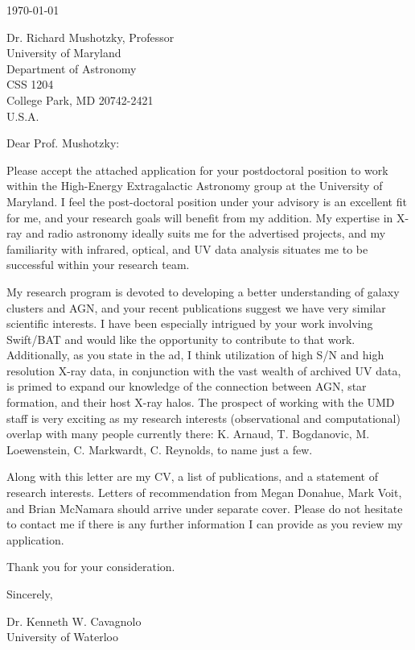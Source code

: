 \documentclass[11pt]{article}
\begin{document}
\today

Dr. Richard Mushotzky, Professor\\
University of Maryland\\
Department of Astronomy\\
CSS 1204\\
College Park, MD 20742-2421\\
U.S.A.

Dear Prof. Mushotzky:

Please accept the attached application for your postdoctoral position
to work within the High-Energy Extragalactic Astronomy group at the
University of Maryland. I feel the post-doctoral position under your
advisory is an excellent fit for me, and your research goals will
benefit from my addition. My expertise in X-ray and radio astronomy
ideally suits me for the advertised projects, and my familiarity with
infrared, optical, and UV data analysis situates me to be successful
within your research team.

My research program is devoted to developing a better understanding of
galaxy clusters and AGN, and your recent publications suggest we have
very similar scientific interests. I have been especially intrigued by
your work involving Swift/BAT and would like the opportunity to
contribute to that work. Additionally, as you state in the ad, I think
utilization of high S/N and high resolution X-ray data, in conjunction
with the vast wealth of archived UV data, is primed to expand our
knowledge of the connection between AGN, star formation, and their
host X-ray halos. The prospect of working with the UMD staff is very
exciting as my research interests (observational and computational)
overlap with many people currently there: K. Arnaud, T. Bogdanovic,
M. Loewenstein, C. Markwardt, C. Reynolds, to name just a few.

Along with this letter are my CV, a list of publications, and a
statement of research interests. Letters of recommendation from Megan
Donahue, Mark Voit, and Brian McNamara should arrive under separate
cover. Please do not hesitate to contact me if there is any further
information I can provide as you review my application.

Thank you for your consideration.

Sincerely,\\
\begin{minipage}{7.5in}
\end{minipage}
Dr. Kenneth W. Cavagnolo\\
University of Waterloo
\end{document}
